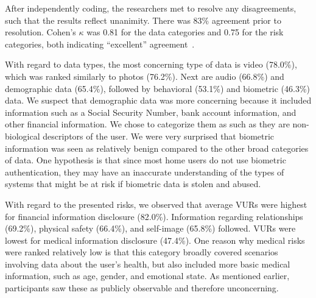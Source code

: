 \documentclass[conference]{IEEEtran}
\begin{document}
After independently coding, the researchers met to resolve any disagreements, such that the results reflect unanimity. There was  83\% agreement prior to resolution. Cohen's $\kappa$ was 0.81 for the data categories and 0.75 for the  risk categories, both indicating ``excellent'' agreement~\cite{Fleiss2003}. 

With regard to data types, the most concerning type of data is video (78.0\%), which was ranked similarly to photos (76.2\%). Next are audio (66.8\%) and demographic data (65.4\%), followed by behavioral (53.1\%) and biometric (46.3\%) data. We suspect that demographic data was more concerning because it included information such as a Social Security Number, bank account information, and other financial information. We chose to categorize them as such as they are non-biological descriptors of the user. We were very surprised that biometric information was seen as relatively benign compared to the other broad categories of data. One hypothesis is that since most home users do not use biometric authentication, they may have an inaccurate understanding of the types of systems that might be at risk if biometric data is stolen and abused.

With regard to the presented risks, we observed that average VURs were highest for financial information disclosure (82.0\%). Information regarding relationships (69.2\%), physical safety (66.4\%), and self-image (65.8\%) followed. VURs were lowest for medical information disclosure (47.4\%). One reason why medical risks were ranked relatively low is that this category broadly covered scenarios involving data about the user's health, but also included more basic medical information, such as age, gender, and emotional state. As mentioned earlier, participants saw these as publicly observable and therefore unconcerning.
\end{document}
